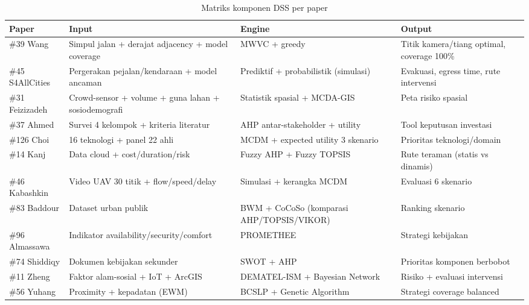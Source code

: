 \documentclass[a4paper,11pt]{article}
\begin{document}
\begin{table}[htbp]
\centering
\small
\setlength{\tabcolsep}{3pt}
\begin{tabular}{p{1.8cm}p{4.2cm}p{4.2cm}p{4.2cm}}
\toprule
\textbf{Paper} & \textbf{Input} & \textbf{Engine} & \textbf{Output} \\
\midrule
\#39 Wang & Simpul jalan + derajat adjacency + model coverage & MWVC + greedy & Titik kamera/tiang optimal, coverage 100\% \\
\#45 S4AllCities & Pergerakan pejalan/kendaraan + model ancaman & Prediktif + probabilistik (simulasi) & Evakuasi, egress time, rute intervensi \\
\#31 Feizizadeh & Crowd-sensor + volume + guna lahan + sosiodemografi & Statistik spasial + MCDA-GIS & Peta risiko spasial \\
\#37 Ahmed & Survei 4 kelompok + kriteria literatur & AHP antar-stakeholder + utility & Tool keputusan investasi \\
\#126 Choi & 16 teknologi + panel 22 ahli & MCDM + expected utility 3 skenario & Prioritas teknologi/domain \\
\#14 Kanj & Data cloud + cost/duration/risk & Fuzzy AHP + Fuzzy TOPSIS & Rute teraman (statis vs dinamis) \\
\#46 Kabashkin & Video UAV 30 titik + flow/speed/delay & Simulasi + kerangka MCDM & Evaluasi 6 skenario \\
\#83 Baddour & Dataset urban publik & BWM + CoCoSo (komparasi AHP/TOPSIS/VIKOR) & Ranking skenario \\
\#96 Almassawa & Indikator availability/security/comfort & PROMETHEE & Strategi kebijakan \\
\#74 Shiddiqy & Dokumen kebijakan sekunder & SWOT + AHP & Prioritas komponen berbobot \\
\#11 Zheng & Faktor alam-sosial + IoT + ArcGIS & DEMATEL-ISM + Bayesian Network & Risiko + evaluasi intervensi \\
\#56 Yuhang & Proximity + kepadatan (EWM) & BCSLP + Genetic Algorithm & Strategi coverage balanced \\
\bottomrule
\end{tabular}
\caption{Matriks komponen DSS per paper}
\end{table}
\end{document}
